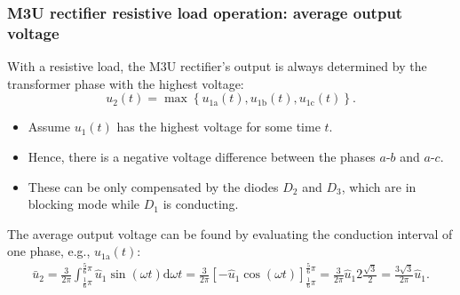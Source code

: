 \begin{frame}
    \frametitle{M3U rectifier resistive load operation: average output voltage}
    With a resistive load, the M3U rectifier's output is always determined by the transformer phase with the highest voltage: 
    \begin{equation}
        u_2(t) = \max\left\{u_{1\mathrm{a}}(t), u_{1\mathrm{b}}(t), u_{1\mathrm{c}}(t) \right\}.
    \end{equation}
    \begin{itemize}
        \item Assume $u_1(t)$ has the highest voltage for some time $t$.
        \item Hence, there is a negative voltage difference between the phases $a$-$b$ and $a$-$c$.
        \item These can be only compensated by the diodes $D_2$ and $D_3$, which are in blocking mode while $D_1$ is conducting.
    \end{itemize}
    The average output voltage can be found by evaluating the conduction interval of one phase, e.g., $u_{1\mathrm{a}}(t)$:
    \begin{equation}
        \begin{split}
            \bar{u}_2 = \frac{3}{2\pi} \int^{\frac{5}{6}\pi}_{\frac{1}{6}\pi} \hat{u}_1 \sin(\omega t) \mathrm{d}\omega t = \frac{3}{2\pi} \left[-\hat{u}_1 \cos(\omega t) \right]^{\frac{5}{6}\pi}_{\frac{1}{6}\pi} = \frac{3}{2\pi}\hat{u}_1 2\frac{\sqrt{3}}{2} = \frac{3\sqrt{3}}{2\pi}\hat{u}_1.
        \end{split}
        \label{eq:M3U_average_output_voltage}
    \end{equation}
\end{frame}

